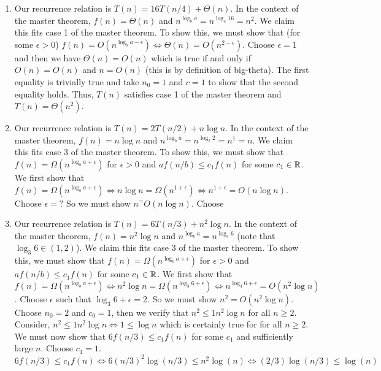 \documentclass{article}
\begin{document}
\begin{enumerate}
    \item Our recurrence relation is $T(n) = 16T(n/4) + \Theta (n)$.
    In the context of the master theorem, $f(n) = \Theta (n)$ and $n^{\log_b a} = n^{\log_4 16} = n^2$.
    We claim this fits case 1 of the master theorem.
    To show this, we must show that (for some $\epsilon > 0$) $f(n) = O(n^{\log_b a - \epsilon}) \iff \Theta (n) = O(n^{2 - \epsilon})$. \parspace
    Choose $\epsilon = 1$ and then we have $\Theta (n) = O(n)$ which is true if and only if $O(n) = O(n)$ and $n = O(n)$ (this is by definition of big-theta).
    The first equality is trivially true and take $n_0 = 1$ and $c = 1$ to show that the second equality holds. \parspace
    Thus, $T(n)$ satisfies case 1 of the master theorem and $T(n) = \Theta (n^2)$.
    \item Our recurrence relation is $T(n) = 2T(n/2) + n \log n$.
    In the context of the master theorem, $f(n) = n \log n$ and $n^{\log_b a} = n^{\log_2 2} = n^1 = n$.
    We claim this fits case 3 of the master theorem.
    To show this, we must show that $f(n) = \Omega (n^{\log_b a + \epsilon})$ for $\epsilon > 0$ and $a f(n/b) \leq c_1 f(n)$ for some $c_1 \in {\mathbb R}$. \parspace
    We first show that $f(n) = \Omega (n^{\log_b a + \epsilon}) \iff n \log n = \Omega (n^{1 + \epsilon}) \iff n^{1 + \epsilon} = O(n \log n)$.
    Choose $\epsilon = ?$
    So we must show $n^ = O(n \log n)$.
    Choose
    \item Our recurrence relation is $T(n) = 6T(n/3) + n^2 \log n$.
    In the context of the master theorem, $f(n) = n^2 \log n$ and $n^{\log_b a} = n^{\log_3 6}$ (note that $\log_3 6 \in (1,2)$).
    We claim this fits case 3 of the master theorem.
    To show this, we must show that $f(n) = \Omega (n^{\log_b a + \epsilon})$ for $\epsilon > 0$ and $a f(n/b) \leq c_1 f(n)$ for some $c_1 \in {\mathbb R}$. \parspace
    We first show that $f(n) = \Omega (n^{\log_b a + \epsilon}) \iff n^2 \log n = \Omega (n^{\log_3 6 + \epsilon}) \iff n^{\log_3 6 + \epsilon} = O(n^2 \log n)$.
    Choose $\epsilon$ such that $\log_3 6 + \epsilon = 2$.
    So we must show $n^2 = O(n^2 \log n)$.
    Choose $n_0 = 2$ and $c_0 = 1$, then we verify that $n^2 \leq 1 n^2 \log n$ for all $n \geq 2$.
    Consider, $ n^2 \leq 1 n^2 \log n \iff 1 \leq \log n $ which is certainly true for for all $n \geq 2$. \parspace
    We must now show that $6 f(n/3) \leq c_1 f(n)$ for some $c_1$ and sufficiently large $n$.
    Choose $c_1 = 1$.
    $$ 6 f(n/3) \leq c_1 f(n) \iff 6 (n/3)^2 \log(n/3) \leq n^2 \log(n) \iff (2/3) \log (n/3) \leq \log (n) $$

\end{enumerate}
\end{document}
